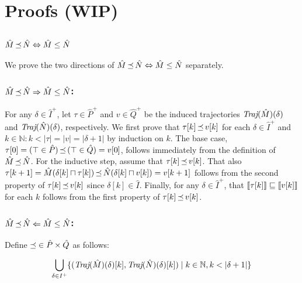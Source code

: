\section{Proofs (WIP)}

\subsection{$\hat M \operatorname{\mathrel{\preceq}} \hat N \Leftrightarrow \hat M \leq \hat N$}

We prove the two directions of $\hat M \operatorname{\mathrel{\preceq}} \hat N \Leftrightarrow \hat M \leq \hat N$ separately.

\subsubsection{$\hat M \operatorname{\mathrel{\preceq}} \hat N \Rightarrow \hat M \leq \hat N$:} For any $\delta \in \hat I^{+}$, let $\tau \in \hat P^{+}$ and $v \in \hat Q^{+}$ be the induced trajectories $\textit{Traj}(\hat M)(\delta)$ and $\textit{Traj}(\hat N)(\delta)$, respectively. We first prove that $\tau[k] \operatorname{\mathrel{\preceq}} v[k]$ for each $\delta \in \hat I^{+}$ and $k \in \mathbb{N} : k < | \tau | = | v | = | \delta + 1 |$ by induction on $k$. The base case, $\tau[0] = (\top \in \hat P) \operatorname{\mathrel{\preceq}} \, (\top \in \hat Q) = v[0]$, follows immediately from the definition of $\hat M \operatorname{\mathrel{\preceq}} \hat N$. For the inductive step, assume that $\tau[k] \operatorname{\mathrel{\preceq}} v[k]$. That also $\tau[k+1] = \hat M(\delta[k] \sqcap \tau[k]) \operatorname{\mathrel{\preceq}} \hat N(\delta[k] \sqcap v[k]) = v[k+1]$ follows from the second property of $\tau[k] \operatorname{\mathrel{\preceq}} v[k]$ since $\delta[k] \in \hat I$. Finally, for any $\delta \in \hat I^{+}$, that $\llbracket\tau[k]\rrbracket \sqsubseteq \llbracket v[k]\rrbracket$ for each $k$ follows from the first property of $\tau[k] \operatorname{\mathrel{\preceq}} v[k]$. 

\subsubsection{$\hat M \operatorname{\mathrel{\preceq}} \hat N \Leftarrow \hat M \leq \hat N$:} Define $\operatorname{\mathrel{\preceq}} \in \hat P \times \hat Q$ as follows:

\begin{equation*}
\bigcup_{\delta \in I^{+}} \{ (\textit{Traj}(\hat M)(\delta)[k], \textit{Traj}(\hat N)(\delta)[k]) \mid k \in \mathbb{N}, k < | \delta + 1 | \}
\end{equation*}

